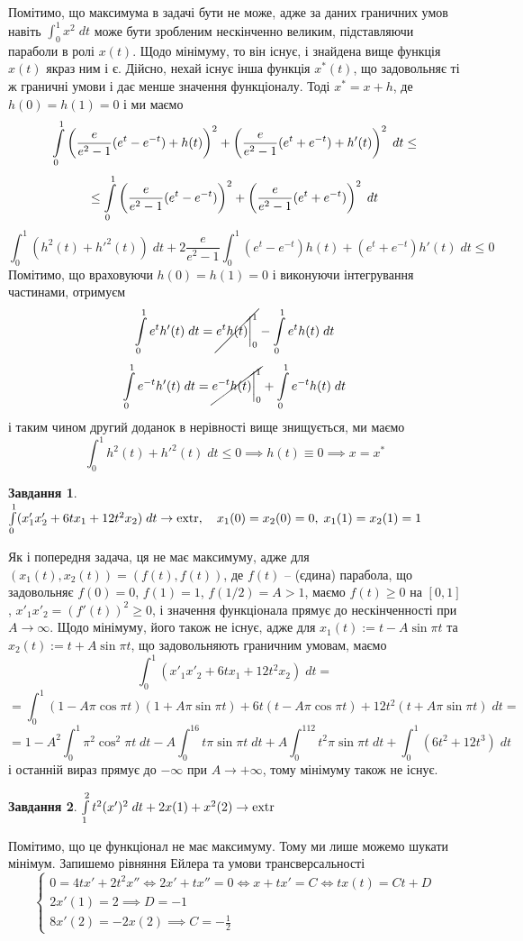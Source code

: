 \documentclass[12pt]{article} %
\newtheorem{prob}{Завдання}
\newcommand{\dt}{\;dt}
\newcommand{\extr}{\mbox{\normalfont extr}}
\begin{document}
Помітимо, що максимума в задачі бути не може, адже за даних граничних умов навіть $\int_0^1x^2\dt$ може бути зробленим нескінченно
великим, підставляючи параболи в ролі $x(t)$. Щодо мінімуму, то він існує, і знайдена вище функція $x(t)$ якраз ним і є. Дійсно, нехай
існує інша функція $x^*(t)$, що задовольняє ті ж граничні умови і дає менше значення функціоналу. Тоді $x^*=x+h$, де $h(0)=h(1)=0$ і ми маємо
\[\int_0^1\mybra{\frac{e}{e^2-1}(e^t-e^{-t})+h(t)}^2+\mybra{\frac{e}{e^2-1}(e^t+e^{-t})+h'(t)}^2\dt\leq\]
\[\leq\int_0^1\mybra{\frac{e}{e^2-1}(e^t-e^{-t})}^2+\mybra{\frac{e}{e^2-1}(e^t+e^{-t})}^2\dt\]
\[\int_0^1(h^2(t)+h'^2(t))\dt+2\frac{e}{e^2-1}\int_0^1(e^t-e^{-t})h(t)+(e^t+e^{-t})h'(t)\dt\leq0\]
Помітимо, що враховуючи $h(0)=h(1)=0$ і виконуючи інтегрування частинами, отримуєм
\[\int_0^1e^th'(t)\dt=\cancel{e^th(t)\bigg|_0^1}-\int_0^1e^th(t)\dt\]
\[\int_0^1e^{-t}h'(t)\dt=\cancel{e^{-t}h(t)\bigg|_0^1}+\int_0^1e^{-t}h(t)\dt\]
і таким чином другий доданок в нерівності вище знищується, ми маємо
\[\int_0^1h^2(t)+h'^2(t)\dt\leq0\implies h(t)\equiv0\implies x=x^*\]
\begin{prob}{}\; $\int_0^1(x'_1x'_2+6tx_1+12t^2x_2)\dt\to\extr,\quad x_1(0)=x_2(0)=0,\;x_1(1)=x_2(1)=1$
\end{prob}
Як і попередня задача, ця не має максимуму, адже для $(x_1(t),x_2(t))=(f(t),f(t))$, де $f(t)$ -- (єдина) парабола, що задовольняє 
$f(0)=0$, $f(1)=1$, $f(1/2)=A>1$, маємо $f(t)\geq0$ на $[0,1]$, $x'_1x'_2=(f'(t))^2\geq0$, і значення функціонала прямує до нескінченності при
$A\to\infty$. Щодо мінімуму, його також не існує, адже для $x_1(t):=t-A\sin\pi t$ та $x_2(t):=t+A\sin\pi t$, що задовольняють граничним
умовам, маємо
\[\int_0^1(x'_1x'_2+6tx_1+12t^2x_2)\dt=\]
\[=\int_0^1(1-A\pi\cos\pi t)(1+A\pi\sin\pi t)+6t(t-A\pi\cos\pi t)+12t^2(t+A\pi\sin\pi t)\dt=\]
\[=1-A^2\int_0^1\pi^2\cos^2\pi t\dt-A\int_0^16t\pi\sin\pi t\dt+A\int_0^112t^2\pi\sin\pi t\dt+\int_0^1(6t^2+12t^3)\dt\]
і останній вираз прямує до $-\infty$ при $A\to+\infty$, тому мінімуму також не існує.
\begin{prob}{}\; $\int_1^2t^2(x')^2\dt+2x(1)+x^2(2)\to\extr$
\end{prob}
Помітимо, що це функціонал не має максимуму. Тому ми лише можемо шукати мінімум.
Запишемо рівняння Ейлера та умови трансверсальності
\[\begin{cases}
	0=4tx'+2t^2x''\iff 2x'+tx''=0\iff x+tx'=C\iff tx(t)=Ct+D\\
	2x'(1)=2\implies D=-1\\
	8x'(2)=-2x(2)\implies C=-\frac{1}{2}
\end{cases}\]
\end{document}
